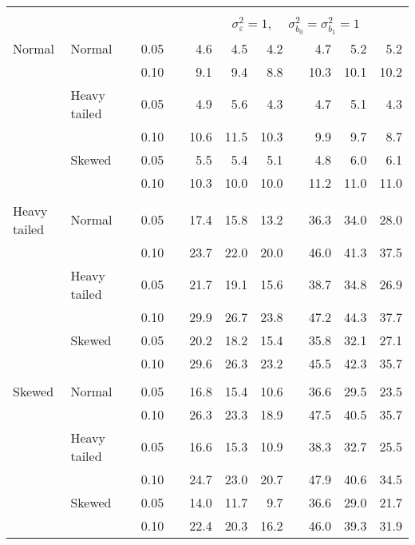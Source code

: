 \begin{table}[ht]
\begin{scriptsize}
\begin{tabular}{ll p{.1cm} c p{.1cm} rrr p{.1cm} rrr}
&&&&&&&&&&&\\
& && && \multicolumn{7}{c}{$\sigma_{\varepsilon}^2 = 1$, \ \ $\sigma_{b_0}^2 = \sigma_{b_1}^2 = 1$} \\ \cline{6-12}
\rowcolor{gray!20} Normal & Normal &  & 0.05 &  & 4.6 & 4.5 & 4.2 &  & 4.7 & 5.2 & 5.2 \\ 
\rowcolor{gray!20}    &  &  & 0.10 &  & 9.1 & 9.4 & 8.8 &  & 10.3 & 10.1 & 10.2 \\ 
\rowcolor{gray!20}    & Heavy tailed &  & 0.05 &  & 4.9 & 5.6 & 4.3 &  & 4.7 & 5.1 & 4.3 \\ 
\rowcolor{gray!20}    &  &  & 0.10 &  & 10.6 & 11.5 & 10.3 &  & 9.9 & 9.7 & 8.7 \\ 
\rowcolor{gray!20}    & Skewed &  & 0.05 &  & 5.5 & 5.4 & 5.1 &  & 4.8 & 6.0 & 6.1 \\ 
\rowcolor{gray!20}    &  &  & 0.10 &  & 10.3 & 10.0 & 10.0 &  & 11.2 & 11.0 & 11.0 \\ 
&&&&&&&&&&&\\
  Heavy tailed & Normal &  & 0.05 &  & 17.4 & 15.8 & 13.2 &  & 36.3 & 34.0 & 28.0 \\ 
   &  &  & 0.10 &  & 23.7 & 22.0 & 20.0 &  & 46.0 & 41.3 & 37.5 \\ 
   & Heavy tailed &  & 0.05 &  & 21.7 & 19.1 & 15.6 &  & 38.7 & 34.8 & 26.9 \\ 
   &  &  & 0.10 &  & 29.9 & 26.7 & 23.8 &  & 47.2 & 44.3 & 37.7 \\ 
   & Skewed &  & 0.05 &  & 20.2 & 18.2 & 15.4 &  & 35.8 & 32.1 & 27.1 \\ 
   &  &  & 0.10 &  & 29.6 & 26.3 & 23.2 &  & 45.5 & 42.3 & 35.7 \\ 
&&&&&&&&&&&\\
  Skewed & Normal &  & 0.05 &  & 16.8 & 15.4 & 10.6 &  & 36.6 & 29.5 & 23.5 \\ 
   &  &  & 0.10 &  & 26.3 & 23.3 & 18.9 &  & 47.5 & 40.5 & 35.7 \\ 
   & Heavy tailed &  & 0.05 &  & 16.6 & 15.3 & 10.9 &  & 38.3 & 32.7 & 25.5 \\ 
   &  &  & 0.10 &  & 24.7 & 23.0 & 20.7 &  & 47.9 & 40.6 & 34.5 \\ 
   & Skewed &  & 0.05 &  & 14.0 & 11.7 & 9.7 &  & 36.6 & 29.0 & 21.7 \\ 
   &  &  & 0.10 &  & 22.4 & 20.3 & 16.2 &  & 46.0 & 39.3 & 31.9 \\ 


\end{tabular}
\end{scriptsize}
\end{table}
